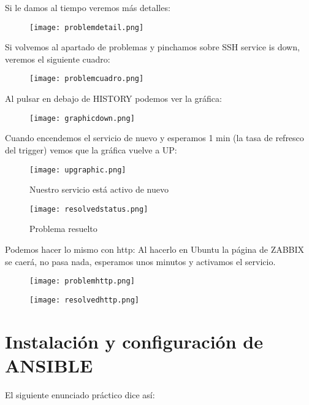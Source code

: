 Si le damos al tiempo veremos más detalles:
\begin{figure}[H]
	\centering
	\texttt{[image: problemdetail.png]} 
\end{figure}

Si volvemos al apartado de problemas y pinchamos sobre SSH service is down, veremos el siguiente cuadro:
\begin{figure}[H]
	\centering
	\texttt{[image: problemcuadro.png]} 
\end{figure}

Al pulsar en debajo de HISTORY podemos ver la gráfica:
	\begin{figure}[H]
	\centering
	\texttt{[image: graphicdown.png]} 
\end{figure}

Cuando encendemos el servicio de nuevo y esperamos 1 min (la tasa de refresco del trigger) vemos que la gráfica vuelve a UP:
\begin{figure}[H]
	\centering
	\texttt{[image: upgraphic.png]} 
	\caption{Nuestro servicio está activo de nuevo}
\end{figure}
\begin{figure}[H]
	\centering
	\texttt{[image: resolvedstatus.png]} 
	\caption{Problema resuelto}
\end{figure}
Podemos hacer lo mismo con http: 
Al hacerlo en Ubuntu la página de ZABBIX se caerá, no pasa nada, esperamos unos minutos y activamos el servicio.

\begin{figure}[H]
	\centering
	\texttt{[image: problemhttp.png]} 
\end{figure}
		\begin{figure}[H]
	\centering
	\texttt{[image: resolvedhttp.png]} 
\end{figure}

\section{Instalación y configuración de ANSIBLE}
El siguiente enunciado práctico dice así: \\

